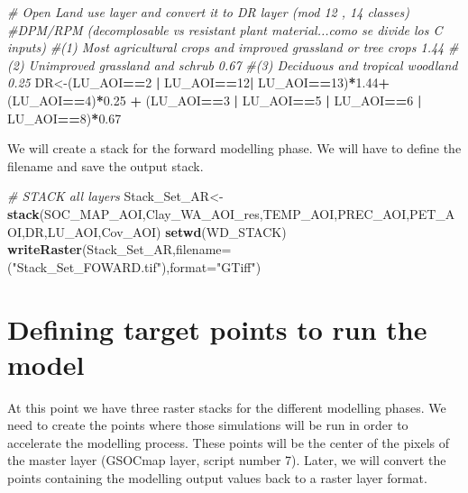 \documentclass[
  10pt,
  b5paper,
]{book}
\newenvironment{Shaded}{\begin{snugshade}}{\end{snugshade}}
\newcommand{\CommentTok}[1]{\textcolor[rgb]{0.56,0.35,0.01}{\textit{#1}}}
\newcommand{\DataTypeTok}[1]{\textcolor[rgb]{0.13,0.29,0.53}{#1}}
\newcommand{\DecValTok}[1]{\textcolor[rgb]{0.00,0.00,0.81}{#1}}
\newcommand{\FloatTok}[1]{\textcolor[rgb]{0.00,0.00,0.81}{#1}}
\newcommand{\KeywordTok}[1]{\textcolor[rgb]{0.13,0.29,0.53}{\textbf{#1}}}
\newcommand{\NormalTok}[1]{#1}
\newcommand{\OperatorTok}[1]{\textcolor[rgb]{0.81,0.36,0.00}{\textbf{#1}}}
\newcommand{\StringTok}[1]{\textcolor[rgb]{0.31,0.60,0.02}{#1}}
\begin{document}
\begin{Shaded}
\begin{Highlighting}[]
\CommentTok{# Open Land use layer and convert it to DR layer (mod 12 , 14 classes)}
\CommentTok{#DPM/RPM (decomplosable vs resistant plant material...como se divide los C inputs)}
\CommentTok{#(1) Most agricultural crops and improved grassland or tree crops 1.44 }
\CommentTok{#(2) Unimproved grassland and schrub 0.67}
\CommentTok{#(3) Deciduous and tropical woodland 0.25    }
\NormalTok{DR<-(LU_AOI}\OperatorTok{==}\DecValTok{2} \OperatorTok{|}\StringTok{ }\NormalTok{LU_AOI}\OperatorTok{==}\DecValTok{12}\OperatorTok{|}\StringTok{ }\NormalTok{LU_AOI}\OperatorTok{==}\DecValTok{13}\NormalTok{)}\OperatorTok{*}\FloatTok{1.44}\OperatorTok{+}\StringTok{ }\NormalTok{(LU_AOI}\OperatorTok{==}\DecValTok{4}\NormalTok{)}\OperatorTok{*}\FloatTok{0.25} \OperatorTok{+}\StringTok{ }\NormalTok{(LU_AOI}\OperatorTok{==}\DecValTok{3} \OperatorTok{|}\StringTok{ }\NormalTok{LU_AOI}\OperatorTok{==}\DecValTok{5} \OperatorTok{|}\StringTok{ }\NormalTok{LU_AOI}\OperatorTok{==}\DecValTok{6} \OperatorTok{|}\StringTok{ }\NormalTok{LU_AOI}\OperatorTok{==}\DecValTok{8}\NormalTok{)}\OperatorTok{*}\FloatTok{0.67}
\end{Highlighting}
\end{Shaded}

We will create a stack for the forward modelling phase. We will have to define the filename and save the output stack.

\begin{Shaded}
\begin{Highlighting}[]
\CommentTok{# STACK all layers}
\NormalTok{Stack_Set_AR<-}\KeywordTok{stack}\NormalTok{(SOC_MAP_AOI,Clay_WA_AOI_res,TEMP_AOI,PREC_AOI,PET_AOI,DR,LU_AOI,Cov_AOI)}
\KeywordTok{setwd}\NormalTok{(WD_STACK)}
\KeywordTok{writeRaster}\NormalTok{(Stack_Set_AR,}\DataTypeTok{filename=}\NormalTok{(}\StringTok{"Stack_Set_FOWARD.tif"}\NormalTok{),}\DataTypeTok{format=}\StringTok{"GTiff"}\NormalTok{)}
\end{Highlighting}
\end{Shaded}

\hypertarget{defining-target-points-to-run-the-model}{%
\section{Defining target points to run the model}\label{defining-target-points-to-run-the-model}}

At this point we have three raster stacks for the different modelling phases. We need to create the points where those simulations will be run in order to accelerate the modelling process. These points will be the center of the pixels of the master layer (GSOCmap layer, script number 7). Later, we will convert the points containing the modelling output values back to a raster layer format.
\end{document}
